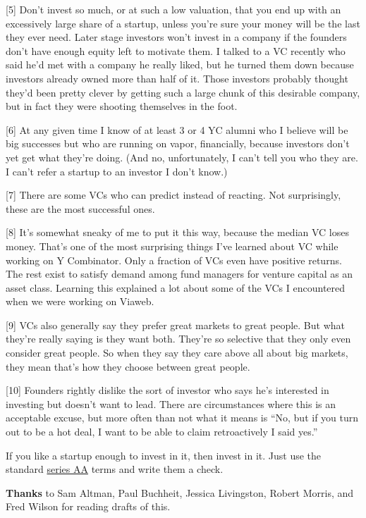 {[}5{]} Don't invest so much, or at such a low valuation, that you end
up with an excessively large share of a startup, unless you're sure your
money will be the last they ever need. Later stage investors won't
invest in a company if the founders don't have enough equity left to
motivate them. I talked to a VC recently who said he'd met with a
company he really liked, but he turned them down because investors
already owned more than half of it. Those investors probably thought
they'd been pretty clever by getting such a large chunk of this
desirable company, but in fact they were shooting themselves in the
foot.

{[}6{]} At any given time I know of at least 3 or 4 YC alumni who I
believe will be big successes but who are running on vapor, financially,
because investors don't yet get what they're doing. (And no,
unfortunately, I can't tell you who they are. I can't refer a startup to
an investor I don't know.)

{[}7{]} There are some VCs who can predict instead of reacting. Not
surprisingly, these are the most successful ones.

{[}8{]} It's somewhat sneaky of me to put it this way, because the
median VC loses money. That's one of the most surprising things I've
learned about VC while working on Y Combinator. Only a fraction of VCs
even have positive returns. The rest exist to satisfy demand among fund
managers for venture capital as an asset class. Learning this explained
a lot about some of the VCs I encountered when we were working on
Viaweb.

{[}9{]} VCs also generally say they prefer great markets to great
people. But what they're really saying is they want both. They're so
selective that they only even consider great people. So when they say
they care above all about big markets, they mean that's how they choose
between great people.

{[}10{]} Founders rightly dislike the sort of investor who says he's
interested in investing but doesn't want to lead. There are
circumstances where this is an acceptable excuse, but more often than
not what it means is ``No, but if you turn out to be a hot deal, I want
to be able to claim retroactively I said yes.''

If you like a startup enough to invest in it, then invest in it. Just
use the standard \href{http://ycombinator.com/seriesaa.html}{series AA}
terms and write them a check.

\textbf{Thanks} to Sam Altman, Paul Buchheit, Jessica Livingston, Robert
Morris, and Fred Wilson for reading drafts of this.
